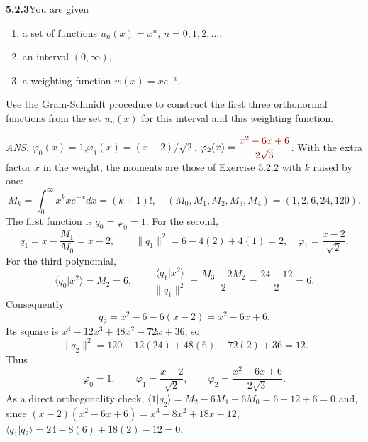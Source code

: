 \par\bigskip
\noindent\textbf{5.2.3}\quad You are given
\begin{enumerate}
\item[(a)] a set of functions $u_{n}(x)=x^{n}$, $n=0,1,2,\ldots$,
\item[(b)] an interval $(0,\infty)$,
\item[(c)] a weighting function $w(x)=xe^{-x}$.
\end{enumerate}
Use the Gram-Schmidt procedure to construct the first three orthonormal
functions from the set $u_{n}(x)$ for this interval and this weighting
function.
\par\nobreak\hfill\emph{ANS.}\enspace
$\varphi_{0}(x)=1$,\quad$\varphi_{1}(x)=(x-2)/\sqrt{2}$,\quad
$\varphi_{2}(x)=\erratum{\dfrac{x^{2}-6x+6}{2\sqrt{3}}}$.
\solution
With the extra factor $x$ in the weight, the moments are those of
Exercise 5.2.2 with $k$ raised by one:
\[
M_k=\int_0^\infty x^kxe^{-x}dx=(k+1)!,
\quad (M_0,M_1,M_2,M_3,M_4)=(1,2,6,24,120).
\]
The first function is $q_0=\varphi_0=1$. For the second,
\[
q_1=x-\frac{M_1}{M_0}=x-2,\qquad
\|q_1\|^2=6-4(2)+4(1)=2,
\quad \varphi_1=\frac{x-2}{\sqrt2}.
\]
For the third polynomial,
\[
\langle q_0|x^2\rangle=M_2=6,\qquad
\frac{\langle q_1|x^2\rangle}{\|q_1\|^2}
=\frac{M_3-2M_2}{2}=\frac{24-12}{2}=6.
\]
Consequently
\[
q_2=x^2-6-6(x-2)=x^2-6x+6.
\]
Its square is $x^4-12x^3+48x^2-72x+36$, so
\[
\|q_2\|^2=120-12(24)+48(6)-72(2)+36=12.
\]
Thus
\[
\boxed{\varphi_0=1,\qquad\varphi_1=\frac{x-2}{\sqrt2},\qquad
\varphi_2=\frac{x^2-6x+6}{2\sqrt3}}.
\]
As a direct orthogonality check,
$\langle1|q_2\rangle=M_2-6M_1+6M_0=6-12+6=0$ and, since
$(x-2)(x^2-6x+6)=x^3-8x^2+18x-12$,
$\langle q_1|q_2\rangle=24-8(6)+18(2)-12=0$.

